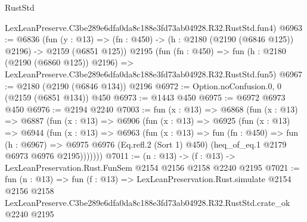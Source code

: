\begin{lexlean}{RustStd}
\begin{coremodule}
    LexLeanPreserve.C3be289e6dfa0da8c188e3fd73ab04928.R32.RustStd.fun4)
@6963 := @6836
    (fun (y : @13) => (fn : @450) -> (h : @2180 (@2190 (@6846 @125)) @2196) -> @2159 (@6851 @125))
    @2195
    (fun (fn : @450) =>
    fun (h : @2180 (@2190 (@6860 @125)) @2196) =>
    LexLeanPreserve.C3be289e6dfa0da8c188e3fd73ab04928.R32.RustStd.fun5)
@6967 := @2180 (@2190 (@6846 @134)) @2196
@6972 := Option.noConfusion.{0, 0} (@2159 (@6851 @134)) @450
@6973 := @1443 @450
@6975 := @6972 @6973 @450
@6976 := @2194 @2240
@7003 := fun (x : @13) =>
  @6868
    (fun (x : @13) =>
    @6887
      (fun (x : @13) =>
      @6906
        (fun (x : @13) =>
        @6925
          (fun (x : @13) =>
          @6944
            (fun (x : @13) =>
            @6963
              (fun (x : @13) =>
              fun (fn : @450) =>
              fun (h : @6967) =>
              @6975 @6976 (Eq.refl.{2} (Sort 1) @450) (heq_of_eq.{1} @2179 @6973 @6976 @2195)))))))
@7011 := (n : @13) -> (f : @13) -> LexLeanPreservation.Rust.FunSem @2154 @2156 @2158 @2240 @2195
@7021 := fun (n : @13) =>
  fun (f : @13) =>
  LexLeanPreservation.Rust.simulate
    @2154
    @2156
    @2158
    LexLeanPreserve.C3be289e6dfa0da8c188e3fd73ab04928.R32.RustStd.crate_ok
    @2240
    @2195
\end{coremodule}
\end{lexlean}
